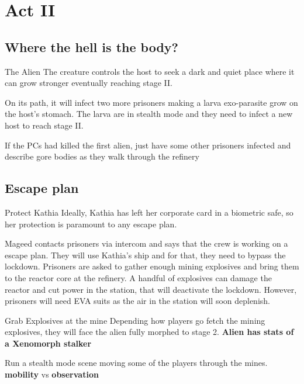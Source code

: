\chapter{Act II}




\section{Where the hell is the body?}


\begin{rpg-commentbox}{The Alien}
   The creature controls the host to seek a dark and quiet place where it can grow stronger eventually reaching stage II.

    On its path, it will infect two more prisoners making a larva exo-parasite grow on the host's stomach. 
    The larva are in stealth mode and they need to infect a new host to reach stage II.

    \medskip

    If the PCs had killed the first alien, just have some other prisoners infected and describe gore bodies as they walk through the refinery
\end{rpg-commentbox}


\newsect

\section{Escape plan}


\begin{rpg-commentbox}{Protect Kathia}
    Ideally, Kathia has left her corporate card in a biometric safe, so her protection is paramount to any escape plan.

    Mageed contacts prisoners via intercom and says that the crew is working on a escape plan. They will use Kathia's ship and for that, they need to bypass the lockdown.
    Prisoners are asked to gather enough mining explosives and bring them to the reactor core at the refinery. A handful of explosives can damage the reactor and cut power in the station, that will deactivate the lockdown. However, prisoners will need EVA suits as the air in the station will soon deplenish.
 \end{rpg-commentbox}


 \begin{rpg-commentbox}{Grab Explosives at the mine}
    Depending how players go fetch the mining explosives, they will face the alien fully morphed to stage 2. \textbf{Alien has stats of a Xenomorph stalker}

    Run a stealth mode scene moving some of the players through the mines. \textbf{mobility} vs \textbf{observation}
 \end{rpg-commentbox}


